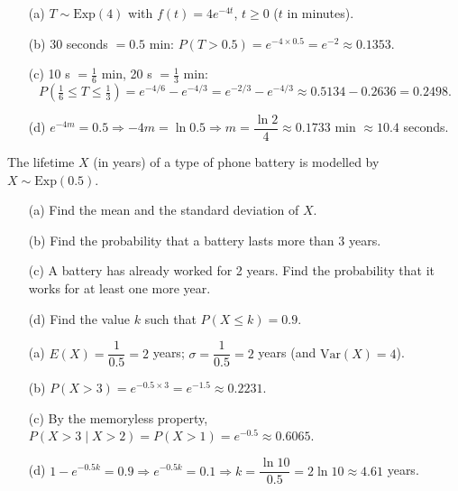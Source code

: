 \documentclass[11pt]{article}
\begin{document}
\begin{corrige}[Exercise 1]
\begin{enumerate}
\item[(a)] $T \sim \mathrm{Exp}(4)$ with $f(t) = 4e^{-4t}$, $t \ge 0$ ($t$ in minutes).
\item[(b)] 30 seconds $= 0.5$ min: $P(T > 0.5) = e^{-4 \times 0.5} = e^{-2} \approx 0.1353$.
\item[(c)] 10 s $= \tfrac{1}{6}$ min, 20 s $= \tfrac{1}{3}$ min:
\[ P\!\left(\tfrac{1}{6} \le T \le \tfrac{1}{3}\right) = e^{-4/6} - e^{-4/3} = e^{-2/3} - e^{-4/3} \approx 0.5134 - 0.2636 = 0.2498. \]
\item[(d)] $e^{-4m} = 0.5 \Rightarrow -4m = \ln 0.5 \Rightarrow m = \dfrac{\ln 2}{4} \approx 0.1733$ min $\approx 10.4$ seconds.
\end{enumerate}
\end{corrige}

\begin{exercice}
The lifetime $X$ (in years) of a type of phone battery is modelled by $X \sim \mathrm{Exp}(0.5)$.
\begin{enumerate}
\item[(a)] Find the mean and the standard deviation of $X$.
\item[(b)] Find the probability that a battery lasts more than 3 years.
\item[(c)] A battery has already worked for 2 years. Find the probability that it works for at least one more year.
\item[(d)] Find the value $k$ such that $P(X \le k) = 0.9$.
\end{enumerate}
\end{exercice}

\begin{corrige}[Exercise 2]
\begin{enumerate}
\item[(a)] $E(X) = \dfrac{1}{0.5} = 2$ years; $\sigma = \dfrac{1}{0.5} = 2$ years (and $\mathrm{Var}(X) = 4$).
\item[(b)] $P(X > 3) = e^{-0.5 \times 3} = e^{-1.5} \approx 0.2231$.
\item[(c)] By the memoryless property, $P(X > 3 \mid X > 2) = P(X > 1) = e^{-0.5} \approx 0.6065$.
\item[(d)] $1 - e^{-0.5k} = 0.9 \Rightarrow e^{-0.5k} = 0.1 \Rightarrow k = \dfrac{\ln 10}{0.5} = 2\ln 10 \approx 4.61$ years.
\end{enumerate}
\end{corrige}
\end{document}
